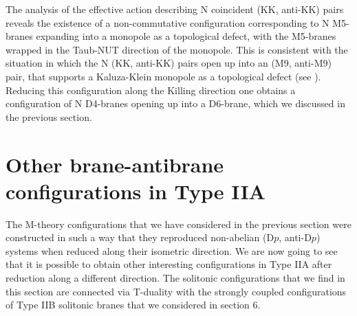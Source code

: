 \documentclass[12pt,a4paper]{article}
\begin{document}
The analysis of the effective action describing N coincident 
(KK, anti-KK) pairs reveals the existence of a non-commutative
configuration corresponding to N M5-branes expanding into a
monopole as a topological defect, with the M5-branes wrapped in
the Taub-NUT direction of the monopole. This is consistent with
the situation in which the N (KK, anti-KK) pairs open up into
an (M9, anti-M9) pair, that supports a Kaluza-Klein monopole as
a topological defect (see \cite{HL1}).
Reducing this configuration along the
Killing direction one obtains a configuration of N D4-branes
opening up into a D6-brane, which we discussed in the previous
section.


\section{Other brane-antibrane configurations in Type IIA}

The M-theory configurations that we have considered 
in the previous section were constructed in such a way that they 
reproduced non-abelian (D$p$, anti-D$p$) systems when
reduced along their isometric direction. We are now going to see
that it is possible
to obtain other interesting configurations in Type IIA after reduction
along a different direction. The solitonic configurations that we
find in this section are connected via T-duality with the strongly
coupled configurations of Type IIB solitonic branes that we considered
in section 6.
\end{document}
